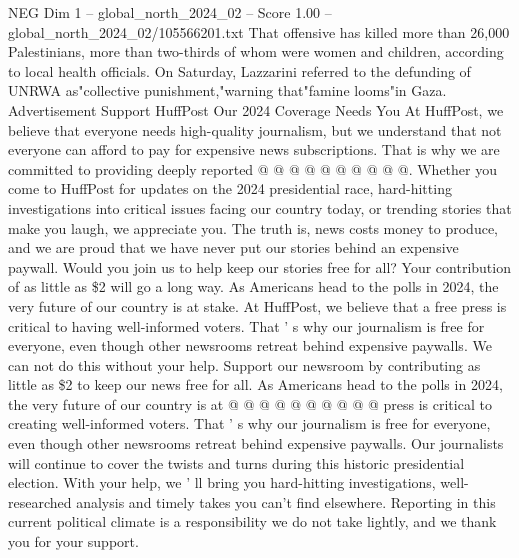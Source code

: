 \begin{textsample}{NEG Dim 1 – global\_north\_2024\_02 – Score 1.00 – global\_north\_2024\_02/105566201.txt}
That offensive has killed more than 26,000 Palestinians, more than two-thirds of whom were women and children, according to local health officials.
On Saturday, Lazzarini referred to the defunding of UNRWA as"collective punishment,"warning that"famine looms"in Gaza.
Advertisement Support HuffPost Our 2024 Coverage Needs You At HuffPost, we believe that everyone needs high-quality journalism, but we understand that not everyone can afford to pay for expensive news subscriptions.
That is why we are committed to providing deeply reported @ @ @ @ @ @ @ @ @ @.
Whether you come to HuffPost for updates on the 2024 presidential race, hard-hitting investigations into critical issues facing our country today, or trending stories that make you laugh, we appreciate you.
The truth is, news costs money to produce, and we are proud that we have never put our stories behind an expensive paywall.
Would you join us to help keep our stories free for all?
Your contribution of as little as \$2 will go a long way.
As Americans head to the polls in 2024, the very future of our country is at stake.
At HuffPost, we believe that a free press is critical to having well-informed voters.
That ' s why our journalism is free for everyone, even though other newsrooms retreat behind expensive paywalls.
We can not do this without your help.
Support our newsroom by contributing as little as \$2 to keep our news free for all.
As Americans head to the polls in 2024, the very future of our country is at @ @ @ @ @ @ @ @ @ @ press is critical to creating well-informed voters.
That ' s why our journalism is free for everyone, even though other newsrooms retreat behind expensive paywalls.
Our journalists will continue to cover the twists and turns during this historic presidential election.
With your help, we ' ll bring you hard-hitting investigations, well-researched analysis and timely takes you can't find elsewhere.
Reporting in this current political climate is a responsibility we do not take lightly, and we thank you for your support.

\end{textsample}
